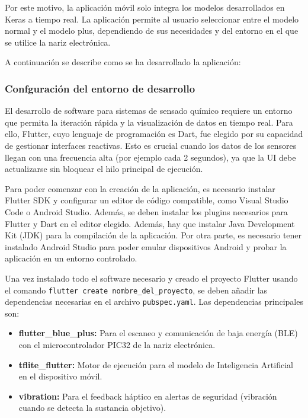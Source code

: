 Por este motivo, la aplicación móvil solo integra los modelos desarrollados en Keras a tiempo real. La aplicación permite al usuario seleccionar entre el modelo normal y el modelo plus, dependiendo de sus necesidades y del entorno en el que se utilice la nariz electrónica.
\par

A continuación se describe como se ha desarrollado la aplicación:

\subsubsection{Confguración del entorno de desarrollo}
El desarrollo de software para sistemas de sensado químico requiere un entorno que permita la iteración rápida y la visualización de datos en tiempo real. Para ello, Flutter, cuyo lenguaje de programación es Dart, fue elegido por su capacidad de gestionar interfaces reactivas. Esto es crucial cuando los datos de los sensores llegan con una frecuencia alta (por ejemplo cada 2 segundos), ya que la UI debe actualizarse sin bloquear el hilo principal de ejecución.
\par

Para poder comenzar con la creación de la aplicación, es necesario instalar Flutter SDK y configurar un editor de código compatible, como Visual Studio Code o Android Studio. Además, se deben instalar los plugins necesarios para Flutter y Dart en el editor elegido. Además, hay que instalar Java Development Kit (JDK) para la compilación de la aplicación. Por otra parte, es necesario tener instalado Android Studio para poder emular dispositivos Android y probar la aplicación en un entorno controlado.
\par

Una vez instalado todo el software necesario y creado el proyecto Flutter usando el comando \texttt{flutter create nombre\_del\_proyecto}, se deben añadir las dependencias necesarias en el archivo \texttt{pubspec.yaml}. Las dependencias principales son:
\begin{itemize}
    \item \textbf{flutter\_blue\_plus:} Para el escaneo y comunicación de baja energía (BLE) con el microcontrolador PIC32 de la nariz electrónica.
    \item \textbf{tflite\_flutter:} Motor de ejecución para el modelo de Inteligencia Artificial en el dispositivo móvil.
    \item \textbf{vibration:} Para el feedback háptico en alertas de seguridad (vibración cuando se detecta la sustancia objetivo).
\end{itemize}

